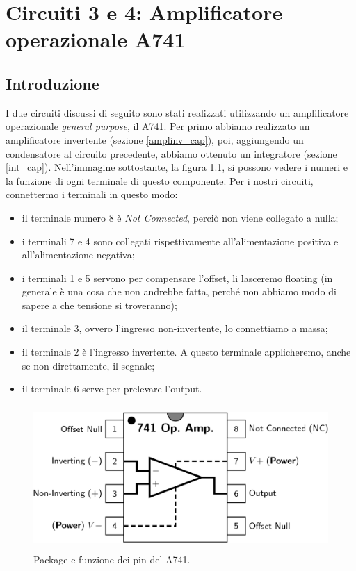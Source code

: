 \documentclass{report}
\begin{document}
\chapter{Circuiti 3 e 4: Amplificatore operazionale \textmu A741}
\section{Introduzione} 
I due circuiti discussi di seguito sono stati realizzati utilizzando un amplificatore operazionale \textit{general purpose}, il \textmu A741. Per primo abbiamo realizzato un amplificatore invertente (sezione \ref{amplinv_cap}), poi, aggiungendo un condensatore al circuito precedente, abbiamo ottenuto un integratore (sezione \ref{int_cap}). Nell'immagine sottostante, la figura \ref{figura:741}, si possono vedere i numeri e la funzione di ogni terminale di questo componente. Per i nostri circuiti, connettermo i terminali in questo modo:
\begin{itemize}
\item il terminale numero 8 è \textit{Not Connected}, perciò non viene collegato a nulla;
\item i terminali 7 e 4 sono collegati rispettivamente all'alimentazione positiva e all'alimentazione negativa;
\item i terminali 1 e 5 servono per compensare l'offset, li lasceremo floating (in generale è una cosa che non andrebbe fatta, perché non abbiamo modo di sapere a che tensione si troveranno);
\item il terminale 3, ovvero l'ingresso non-invertente, lo connettiamo a massa;
\item il terminale 2 è l'ingresso invertente. A questo terminale applicheremo, anche se non direttamente, il segnale; 
\item il terminale 6 serve per prelevare l'output.
\end{itemize}
\begin{figure}[h]
\centering
\includegraphics[height=5.5cm]{immagini/741pinout}
\caption{Package e funzione dei pin del \textmu A741.}
\label{figura:741}
\end{figure}
\end{document}
